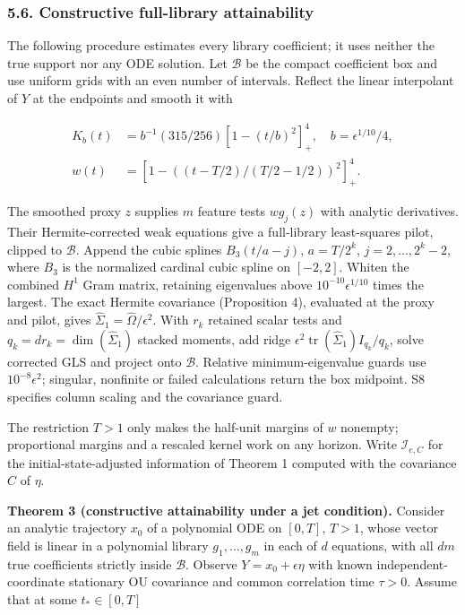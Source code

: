 \documentclass[
  american,
  11pt,
]{article}
\newcounter{none} %
\begin{document}
\subsubsection{5.6. Constructive full-library
attainability}\label{constructive-full-library-attainability}

The following procedure estimates every library coefficient; it uses
neither the true support nor any ODE solution. Let \(\mathcal B\) be the
compact coefficient box and use uniform grids with an even number of
intervals. Reflect the linear interpolant of \(Y\) at the endpoints and
smooth it with

\[
\begin{aligned}
K_b(t)&=b^{-1}(315/256)[1-(t/b)^2]_+^4,\quad b=\epsilon^{1/10}/4,\\
w(t)&=[1-((t-T/2)/(T/2-1/2))^2]_+^4.
\end{aligned}
\]

The smoothed proxy \(z\) supplies \(m\) feature tests \(w g_j(z)\) with
analytic derivatives. Their Hermite-corrected weak equations give a
full-library least-squares pilot, clipped to \(\mathcal B\). Append the
cubic splines \(B_3(t/a-j)\), \(a=T/2^k\), \(j=2,\ldots,2^k-2\), where
\(B_3\) is the normalized cardinal cubic spline on \([-2,2]\). Whiten
the combined \(H^1\) Gram matrix, retaining eigenvalues above
\(10^{-10}\epsilon^{1/10}\) times the largest. The exact Hermite
covariance (Proposition 4), evaluated at the proxy and pilot, gives
\(\widehat\Sigma_1=\widehat\Omega/\epsilon^2\). With \(r_k\) retained
scalar tests and \(q_k=d r_k=\dim(\widehat\Sigma_1)\) stacked moments,
add ridge \(\epsilon^2\operatorname{tr}(\widehat\Sigma_1)I_{q_k}/q_k\),
solve corrected GLS and project onto \(\mathcal B\). Relative
minimum-eigenvalue guards use \(10^{-8}\epsilon^2\); singular, nonfinite
or failed calculations return the box midpoint. S8 specifies column
scaling and the covariance guard.

The restriction \(T>1\) only makes the half-unit margins of \(w\)
nonempty; proportional margins and a rescaled kernel work on any
horizon. Write \(\mathcal I_{e,C}\) for the initial-state-adjusted
information of Theorem 1 computed with the covariance \(C\) of \(\eta\).

\textbf{Theorem 3 (constructive attainability under a jet condition).}
Consider an analytic trajectory \(x_0\) of a polynomial ODE on
\([0,T]\), \(T>1\), whose vector field is linear in a polynomial library
\(g_1,\ldots,g_m\) in each of \(d\) equations, with all \(dm\) true
coefficients strictly inside \(\mathcal B\). Observe
\(Y=x_0+\epsilon\eta\) with known independent-coordinate stationary OU
covariance and common correlation time \(\tau>0\). Assume that at some
\(t_*\in[0,T]\)
\end{document}
